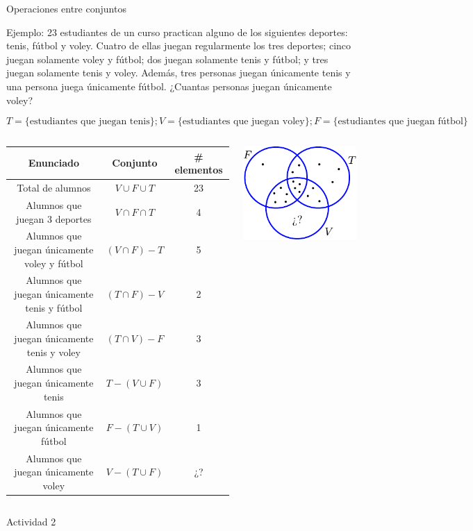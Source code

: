 \documentclass[9pt, aspectratio=169]{beamer}
\begin{document}
\begin{frame}{Operaciones entre conjuntos}
\begin{block}{Ejemplo:}
23 estudiantes de un curso practican alguno de los siguientes deportes: tenis, fútbol y voley. Cuatro de ellas juegan regularmente los tres deportes; cinco juegan solamente voley y fútbol; dos juegan solamente tenis y fútbol; y tres juegan solamente tenis y voley. Además, tres personas juegan únicamente tenis y una persona juega únicamente fútbol. ¿Cuantas personas juegan únicamente voley?
\vspace{-2.5em}
\begin{center}
\[ T = \{\text{estudiantes que juegan tenis}\}; V = \{\text{estudiantes que juegan voley}\}; F = \{\text{estudiantes que juegan fútbol}\} \]
\end{center}
\end{block} \pause
\begin{columns}[c]
{\small
\begin{tabular}{ccc}
\toprule
\textbf{Enunciado} & \textbf{Conjunto} & \textbf{\# elementos} \\
\midrule
Total de alumnos & $V \cup F \cup T$ & 23 \\
Alumnos que juegan 3 deportes & $V \cap F \cap T$ & 4 \\
Alumnos que juegan únicamente voley y fútbol& $(V \cap F) - T$ & 5 \\
Alumnos que juegan únicamente tenis y fútbol& $(T \cap F) - V$ & 2 \\
Alumnos que juegan únicamente tenis y voley& $(T \cap V) - F$ & 3 \\
Alumnos que juegan únicamente tenis& $T - (V \cup F) $ & 3 \\
Alumnos que juegan únicamente fútbol& $F - (T \cup V) $ & 1 \\
Alumnos que juegan únicamente voley& $V - (T \cup F) $ & ¿? \\
\bottomrule
\end{tabular}
}
\begin{center}
    \includegraphics[scale=1.0]{figs/fig-06.pdf}
\end{center}
\end{columns}
\pause

\begin{center}
    {\Large \alert{\faArrowCircleRight \faPen* Actividad 2}}
\end{center}
\end{frame}
\end{document}
